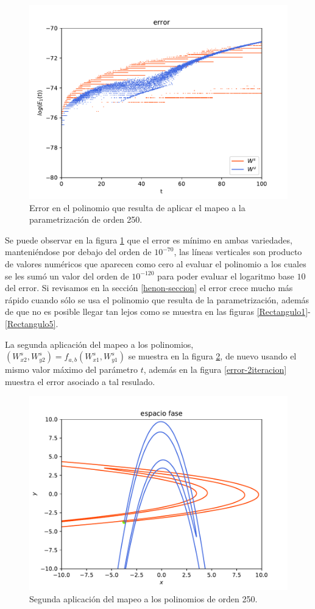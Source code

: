 \begin{figure}[h]
\centering
\includegraphics[scale=0.4]{error1ite}
\caption{Error en el polinomio que resulta de aplicar el mapeo a la parametrización de orden 250.}
\label{error-1iteracion}
\end{figure}
Se puede observar en la figura \ref{error-1iteracion} que el error es mínimo en ambas variedades, manteniéndose por debajo del orden de $10^{-70}$, las líneas verticales son producto de valores numéricos que aparecen como cero al evaluar el polinomio a los cuales se les sumó un valor del orden de $10^{-120}$ para poder evaluar el logaritmo base $10$ del error. Si revisamos en la sección \ref{henon-seccion} el error crece mucho más rápido cuando sólo se usa el polinomio que resulta de la parametrización, además de que no es posible llegar tan lejos como se muestra en las figuras \ref{Rectangulo1}-\ref{Rectangulo5}.

La segunda aplicación del mapeo a los polinomios, $(W_{x2}^{s},W_{y2}^{s})=f_{a,b}(W_{x1}^{s},W_{y1}^{s})$ se muestra en la figura \ref{Rectangulo2}, de nuevo usando el mismo valor máximo del parámetro $t$, además en la figura \ref{error-2iteracion} muestra el error asociado a tal resulado.
\begin{figure}[H]
\centering
\includegraphics[scale=0.5]{rectangulo2}
\caption{Segunda aplicación del mapeo a los polinomios de orden 250.}
\label{Rectangulo2}
\end{figure}

